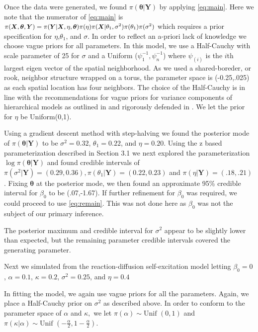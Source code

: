 \documentclass[11pt]{isuthesis}
\begin{document}
Once the data were generated, we found $\pi(\boldsymbol{\theta}|\boldsymbol{Y})$ by applying \eqref{eq:main}.  Here we note that the numerator of \eqref{eq:main} is $\small\pi(\boldsymbol{X},\boldsymbol{\theta},\boldsymbol{Y})=\pi(\boldsymbol{Y}|\boldsymbol{X},\eta,\boldsymbol{\theta})\pi(\eta)\pi(\boldsymbol{X}|\theta_1,\sigma^2)\pi(\theta_1)\pi(\sigma^2)$ which requires a prior specification for $\eta$,$\theta_1$, and $\sigma$.  In order to reflect an a-priori lack of knowledge we choose vague priors for all parameters.   In this model, we use a Half-Cauchy with scale parameter of 25 for $\sigma$ and a Uniform ($\psi_{1}^{-1},\psi_{n}^{-1}$) where $\psi_(i)$ is the $i$th largest eigen vector of the spatial neighborhood.  As we used a shared-boreder, or rook, neighbor structure wrapped on a torus, the parameter space is (-0.25,.025) as each spatial location has four neighbors.  The choice of the Half-Cauchy is in line with the recommendations for vague priors for variance components of hierarchical models as outlined in \cite{gelman2006prior} and rigorously defended in \cite{polson2012half}.  We let the prior for $\eta$ be Uniform(0,1).  

Using a gradient descent method with step-halving we found the posterior mode of $\pi(\boldsymbol{\theta}|\boldsymbol{Y})$ to be $\sigma^2=0.32$, $\theta_1=0.22$, and $\eta=0.20$. Using the z based parameterization described in Section 3.1 we next explored the parameterization $\log\pi(\boldsymbol{\theta}|\boldsymbol{Y})$ and found credible intervals of $\pi(\sigma^2|\boldsymbol{Y})=(0.29,0.36),\pi(\theta_1|\boldsymbol{Y})=(0.22,0.23)$ and $\pi(\eta|\boldsymbol{Y})=(.18,.21)$.  Fixing $\boldsymbol{\theta}$ at the posterior mode, we then found an approximate 95\% credible interval for $\beta_0$ to be (.07,-1.67).  If further refinement for $\beta_0$ was required, we could proceed to use \eqref{eq:remain}.  This was not done here as $\beta_0$ was not the subject of our primary inference.

The posterior maximum and credible interval for $\sigma^2$ appear to be slightly lower than expected, but the remaining parameter credible intervals covered the generating parameter.  

Next we simulated from the reaction-diffusion self-excitation model letting $\beta_0=0$, $\alpha=0.1$, $\kappa=0.2$, $\sigma^2=0.25$, and $\eta=0.4$ 

In fitting the model, we again use vague priors for all the parameters.  Again, we place a Half-Cauchy prior on $\sigma^2$ as described above.  In order to conform to the parameter space of $\alpha$ and $\kappa,$ we let $\pi(\alpha)\sim \text{Unif }(0,1)$ and $\pi(\kappa|\alpha)\sim\text{Unif }(-\frac{\alpha}{2},1-\frac{\alpha}{2})$.
\end{document}
